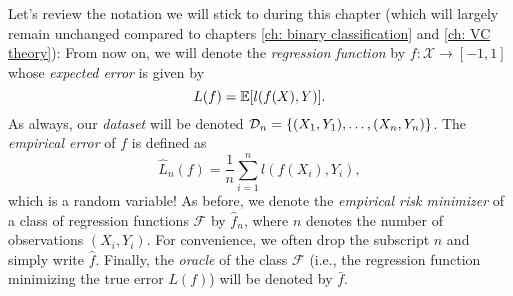 Let's review the notation we will stick to during this chapter (which will largely remain unchanged compared to chapters \ref{ch: binary classification} and \ref{ch: VC theory}): From now on, we will denote the \emph{regression function} by $f \colon \mathcal{X} \to [-1, 1]$ whose \emph{expected error} is given by
\[
    L(f) = \operatorname{\mathbb{E}}[l(f(X), Y)].
\]
As always, our \emph{dataset} will be denoted $\mathcal{D}_n = \set{(X_1, Y_1), \dots, (X_n, Y_n)}$. The \emph{empirical error} of $f$ is defined as
\[
    \hat{L}_n(f) = \frac{1}{n} \sum_{i=1}^n l(f(X_i), Y_i),
\]
which is a random variable! As before, we denote the \emph{empirical risk minimizer} of a class of regression functions $\mathcal{F}$ by $\hat{f}_n$, where $n$ denotes the number of observations $(X_i, Y_i)$. For convenience, we often drop the subscript $n$ and simply write $\hat{f}$. Finally, the \emph{oracle} of the class $\mathcal{F}$ (i.e., the regression function minimizing the true error $L(f)$) will be denoted by $\bar{f}$.
